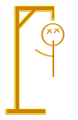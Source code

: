 \begin{figure}[ht]
\begin{subfigure}[b]{0.1\textwidth}
        \includegraphics[width=\textwidth]{./img/gui/hang3.png}
    \end{subfigure}
    \begin{subfigure}[b]{0.1\textwidth}

\end{subfigure}
\end{figure}

